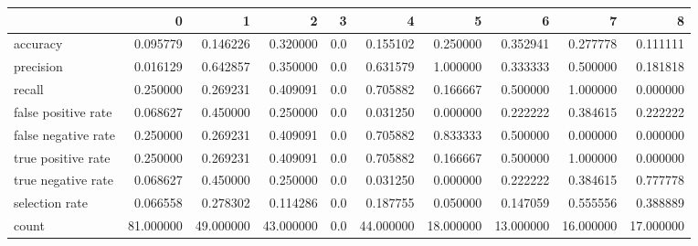 \begin{tabular}{lrrrrrrrrr}
\toprule
{} &          0 &          1 &          2 &    3 &          4 &          5 &          6 &          7 &          8 \\
\midrule
accuracy            &   0.095779 &   0.146226 &   0.320000 &  0.0 &   0.155102 &   0.250000 &   0.352941 &   0.277778 &   0.111111 \\
precision           &   0.016129 &   0.642857 &   0.350000 &  0.0 &   0.631579 &   1.000000 &   0.333333 &   0.500000 &   0.181818 \\
recall              &   0.250000 &   0.269231 &   0.409091 &  0.0 &   0.705882 &   0.166667 &   0.500000 &   1.000000 &   0.000000 \\
false positive rate &   0.068627 &   0.450000 &   0.250000 &  0.0 &   0.031250 &   0.000000 &   0.222222 &   0.384615 &   0.222222 \\
false negative rate &   0.250000 &   0.269231 &   0.409091 &  0.0 &   0.705882 &   0.833333 &   0.500000 &   0.000000 &   0.000000 \\
true positive rate  &   0.250000 &   0.269231 &   0.409091 &  0.0 &   0.705882 &   0.166667 &   0.500000 &   1.000000 &   0.000000 \\
true negative rate  &   0.068627 &   0.450000 &   0.250000 &  0.0 &   0.031250 &   0.000000 &   0.222222 &   0.384615 &   0.777778 \\
selection rate      &   0.066558 &   0.278302 &   0.114286 &  0.0 &   0.187755 &   0.050000 &   0.147059 &   0.555556 &   0.388889 \\
count               &  81.000000 &  49.000000 &  43.000000 &  0.0 &  44.000000 &  18.000000 &  13.000000 &  16.000000 &  17.000000 \\
\bottomrule
\end{tabular}
